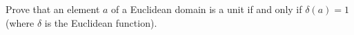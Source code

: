Prove that an element $a$ of a Euclidean domain is a unit if and only if $\delta(a) = 1$ (where $\delta$ is the Euclidean function).
